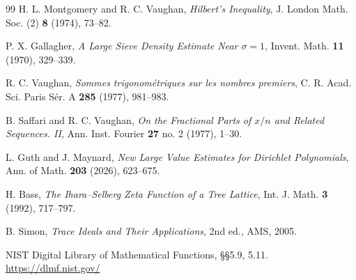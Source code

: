 \documentclass[UTF8,11pt,a4paper]{ctexart}
\theoremstyle{definition}
\theoremstyle{remark}
\newcommand{\1}{\mathbf 1}
\begin{document}
\begin{thebibliography}{99}
H. L. Montgomery and R. C. Vaughan, \emph{Hilbert's Inequality}, J. London Math. Soc. (2) \textbf{8} (1974), 73--82.

P. X. Gallagher, \emph{A Large Sieve Density Estimate Near $\sigma=1$}, Invent. Math. \textbf{11} (1970), 329--339.

R. C. Vaughan, \emph{Sommes trigonom\'etriques sur les nombres premiers}, C. R. Acad. Sci. Paris S\'er. A \textbf{285} (1977), 981--983.

B. Saffari and R. C. Vaughan, \emph{On the Fractional Parts of $x/n$ and Related Sequences. II}, Ann. Inst. Fourier \textbf{27} no. 2 (1977), 1--30.

L. Guth and J. Maynard, \emph{New Large Value Estimates for Dirichlet Polynomials}, Ann. of Math. \textbf{203} (2026), 623--675.

H. Bass, \emph{The Ihara--Selberg Zeta Function of a Tree Lattice}, Int. J. Math. \textbf{3} (1992), 717--797.

B. Simon, \emph{Trace Ideals and Their Applications}, 2nd ed., AMS, 2005.

NIST Digital Library of Mathematical Functions, §§5.9, 5.11.
\url{https://dlmf.nist.gov/}

\end{thebibliography}
\end{document}
